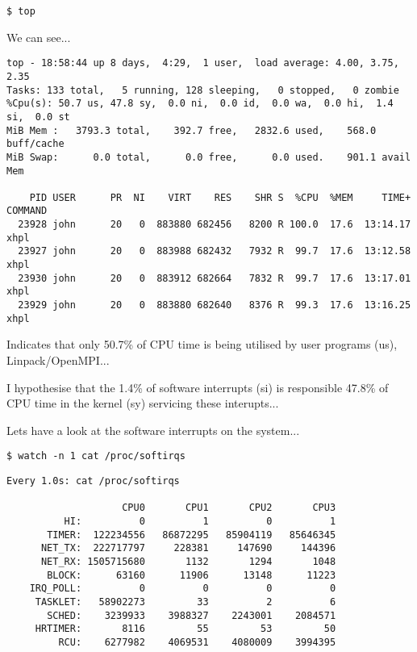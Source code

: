 \lstset{style=type}
\begin{lstlisting}
$ top
\end{lstlisting}

We can see...

\lstset{style=type}
\begin{lstlisting}
top - 18:58:44 up 8 days,  4:29,  1 user,  load average: 4.00, 3.75, 2.35
Tasks: 133 total,   5 running, 128 sleeping,   0 stopped,   0 zombie
%Cpu(s): 50.7 us, 47.8 sy,  0.0 ni,  0.0 id,  0.0 wa,  0.0 hi,  1.4 si,  0.0 st
MiB Mem :   3793.3 total,    392.7 free,   2832.6 used,    568.0 buff/cache
MiB Swap:      0.0 total,      0.0 free,      0.0 used.    901.1 avail Mem 

    PID USER      PR  NI    VIRT    RES    SHR S  %CPU  %MEM     TIME+ COMMAND                                                   
  23928 john      20   0  883880 682456   8200 R 100.0  17.6  13:14.17 xhpl                                                      
  23927 john      20   0  883988 682432   7932 R  99.7  17.6  13:12.58 xhpl                                                      
  23930 john      20   0  883912 682664   7832 R  99.7  17.6  13:17.01 xhpl                                                      
  23929 john      20   0  883880 682640   8376 R  99.3  17.6  13:16.25 xhpl  
\end{lstlisting}

Indicates that only 50.7\% of CPU time is being utilised by user programs (us), Linpack/OpenMPI...

I hypothesise that the 1.4\% of software interrupts (si) is responsible 47.8\% of CPU time in the kernel (sy) servicing these interupts...

Lets have a look at the software interrupts on the system...

\lstset{style=type}
\begin{lstlisting}
$ watch -n 1 cat /proc/softirqs
\end{lstlisting}


\lstset{style=type}
\begin{lstlisting}
Every 1.0s: cat /proc/softirqs

                    CPU0       CPU1       CPU2       CPU3
          HI:          0          1          0          1
       TIMER:  122234556   86872295   85904119   85646345
      NET_TX:  222717797     228381     147690     144396
      NET_RX: 1505715680       1132       1294       1048
       BLOCK:      63160      11906      13148      11223
    IRQ_POLL:          0          0          0          0
     TASKLET:   58902273         33          2          6
       SCHED:    3239933    3988327    2243001    2084571
     HRTIMER:       8116         55         53         50
         RCU:    6277982    4069531    4080009    3994395
\end{lstlisting}


